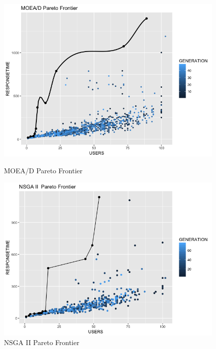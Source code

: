 \documentclass[espaco=umemeio,chapter=TITLE,twoside,openright]{abnt}
\begin{document}
\begin{figure}[h]
\begin{minipage}{.5\textwidth}
\centering
\includegraphics[width=1\textwidth]{./images/moeadnoise.png}
\caption{MOEA/D Pareto Frontier}
\label{fig:moeadnoise}
\end{minipage}
\begin{minipage}{.5\textwidth}
\centering
\includegraphics[width=1\textwidth]{./images/nsgaiinoise.png}
\caption{NSGA II Pareto Frontier}
\label{fig:paretofrontier2}
\end{minipage}
\end{figure}
\end{document}
